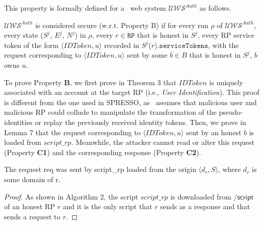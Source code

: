 


\vspace{3mm} This property is formally defined for a \usso\ web system $\mathcal{U\!W\!S}^{Auth}$ as follows. 

\begin{definition}
\label{def:B}
$\mathcal{UWS}^{Auth}$ is considered secure (w.r.t. Property B) if for every run $\rho$ of $\mathcal{UWS}^{Auth}$, every state ($S^j$, $E^j$, $N^j$) in $\rho$, every $r \in \mathtt{RP}$ that is honest in $S^j$, every RP service token of the form $\langle IDToken, u \rangle$ recorded in $S^j$($r$).$\mathtt{serviceTokens}$, with the request corresponding to $\langle IDToken, u \rangle$ sent by some $b \in B$ that is honest in $S^j$, $b$ owns $u$.
\end{definition}

To prove Property {\bf B}, we first prove in Theorem 3 that $IDToken$ %
is uniquely associated with an account at the target RP (i.e., {\em User Identification}). This proof is different from the one used in SPRESSO, as \usso\ assumes that malicious user and malicious RP could collude to manipulate the transformation of the pseudo-identities or replay the previously received identity tokens. 
Then, we prove in Lemma 7 that the request corresponding to $\langle IDToken, u \rangle$ sent by an honest $b$ is loaded from $script\_rp$. 
Meanwhile, the attacker cannot read or alter this request (Property {\bf C1}) and the corresponding response (Property {\bf C2}).

\begin{lemma}
The request req was sent by script\_rp loaded from the origin $\langle d_r, S \rangle$, where $d_r$ is some domain of r.
\end{lemma}

\begin{proof}
As shown in Algorithm 2, the script
$script\_rp$ is downloaded from $\mathsf{/script}$ of an honest RP $r$ and it is the only script that $r$ sends as a response and that sends a request to $r$.
\end{proof}


